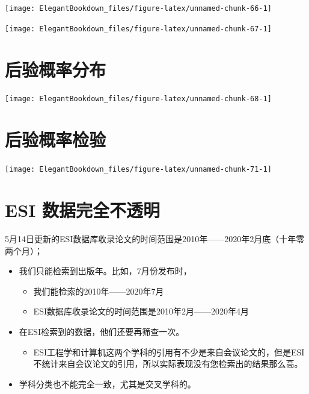 \documentclass[cn, 11pt, fancy, hide]{elegantbook}
\providecommand{\tightlist}{%
  \setlength{\itemsep}{0pt}\setlength{\parskip}{0pt}}
\begin{document}
\begin{center}\texttt{[image: ElegantBookdown\_files/figure-latex/unnamed-chunk-66-1]} \end{center}

\begin{center}\texttt{[image: ElegantBookdown\_files/figure-latex/unnamed-chunk-67-1]} \end{center}

\hypertarget{ux540eux9a8cux6982ux7387ux5206ux5e03}{%
\section{后验概率分布}\label{ux540eux9a8cux6982ux7387ux5206ux5e03}}

\begin{center}\texttt{[image: ElegantBookdown\_files/figure-latex/unnamed-chunk-68-1]} \end{center}

\hypertarget{ux540eux9a8cux6982ux7387ux68c0ux9a8c}{%
\section{后验概率检验}\label{ux540eux9a8cux6982ux7387ux68c0ux9a8c}}

\begin{center}\texttt{[image: ElegantBookdown\_files/figure-latex/unnamed-chunk-71-1]} \end{center}

\hypertarget{esi-ux6570ux636eux5b8cux5168ux4e0dux900fux660e}{%
\section{ESI 数据完全不透明}\label{esi-ux6570ux636eux5b8cux5168ux4e0dux900fux660e}}

5月14日更新的ESI数据库收录论文的时间范围是2010年------2020年2月底（十年零两个月）；

\begin{itemize}
\tightlist
\item
  我们只能检索到出版年。比如，7月份发布时，

  \begin{itemize}
  \tightlist
  \item
    我们能检索的2010年------2020年7月
  \item
    ESI数据库收录论文的时间范围是2010年2月------2020年4月
  \end{itemize}
\item
  在ESI检索到的数据，他们还要再筛查一次。

  \begin{itemize}
  \tightlist
  \item
    ESI工程学和计算机这两个学科的引用有不少是来自会议论文的，但是ESI不统计来自会议论文的引用，所以实际表现没有您检索出的结果那么高。
  \end{itemize}
\item
  学科分类也不能完全一致，尤其是交叉学科的。
\end{itemize}
\end{document}

